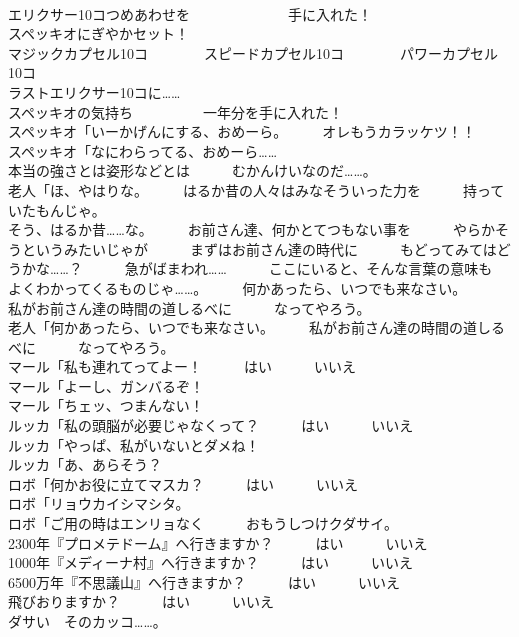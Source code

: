 \documentclass[8pt]{extreport}
\begin{document}
\begin{CJK}{UTF8}{min}
\\	エリクサー10コつめあわせを　　　　　　　手に入れた！	
\\	スペッキオにぎやかセット！	
\\	マジックカプセル10コ　　　　スピードカプセル10コ　　　　パワーカプセル　10コ	
\\	ラストエリクサー10コに……	
\\	スペッキオの気持ち　　　　　一年分を手に入れた！	
\\	スペッキオ「いーかげんにする、おめーら。　　　オレもうカラッケツ！！	
\\	スペッキオ「なにわらってる、おめーら……	
\\	本当の強さとは姿形などとは　　　むかんけいなのだ……。	
\\	老人「ほ、やはりな。　　　はるか昔の人々はみなそういった力を　　　持っていたもんじゃ。	
\\	そう、はるか昔……な。　　　お前さん達、何かとてつもない事を　　　やらかそうというみたいじゃが　　　まずはお前さん達の時代に　　　もどってみてはどうかな……？　　　急がばまわれ……　　　ここにいると、そんな言葉の意味も　　　よくわかってくるものじゃ……。　　　何かあったら、いつでも来なさい。　　　私がお前さん達の時間の道しるべに　　　なってやろう。	
\\	老人「何かあったら、いつでも来なさい。　　　私がお前さん達の時間の道しるべに　　　なってやろう。	
\\	マール「私も連れてってよー！　　　はい　　　いいえ	
\\	マール「よーし、ガンバるぞ！	
\\	マール「ちェッ、つまんない！	
\\	ルッカ「私の頭脳が必要じゃなくって？　　　はい　　　いいえ	
\\	ルッカ「やっぱ、私がいないとダメね！	
\\	ルッカ「あ、あらそう？	
\\	ロボ「何かお役に立てマスカ？　　　はい　　　いいえ	
\\	ロボ「リョウカイシマシタ。　　　
\\	ロボ「ご用の時はエンリョなく　　　おもうしつけクダサイ。	
\\	2300年『プロメテドーム』へ行きますか？　　　はい　　　いいえ	
\\	1000年『メディーナ村』へ行きますか？　　　はい　　　いいえ	
\\	6500万年『不思議山』へ行きますか？　　　はい　　　いいえ	
\\	飛びおりますか？　　　はい　　　いいえ	
\\	ダサい　そのカッコ……。	

\end{CJK}
\end{document}
